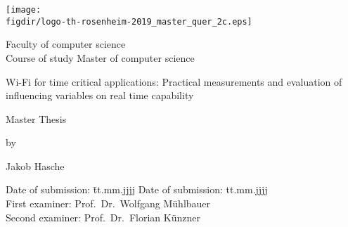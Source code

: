 \begin{titlepage}

\sffamily

\raggedleft

\vspace*{-2cm}

\texttt{[image: \\figdir/logo-th-rosenheim-2019\_master\_quer\_2c.eps]}

\vfill

\centering
\LARGE
Faculty of computer science  \vspace{0.5cm}\\
\Large
Course of study Master of computer science

\vspace{2cm}

\LARGE

Wi-Fi for time critical applications: Practical measurements and evaluation of influencing variables on real time capability

\vspace{2cm}

\Large
Master Thesis

\vspace{1.5cm}


\Large
by

\vspace{0.5cm}


\LARGE
Jakob Hasche \vspace{1cm}

\vspace{1cm}

\flushleft
 \Large
\vspace*{\fill}

\begin{tabbing}
Date of submission: \= tt.mm.jjjj \kill
Date of submission: \> tt.mm.jjjj \\
First examiner: \> Prof.\ Dr.\ Wolfgang Mühlbauer\\
Second examiner: \> Prof.\ Dr.\ Florian Künzner
\end{tabbing}

\end{titlepage}

\cleardoubleemptypage

